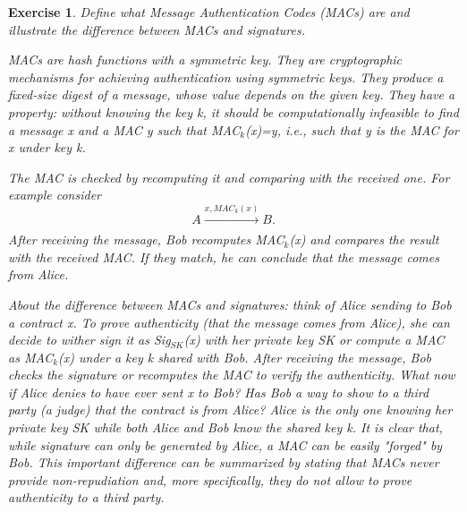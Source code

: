 \documentclass[a4paper, 12pt]{report}
\newtheorem{exercise}{\textbf{Exercise}}
\begin{document}
\begin{exercise}
	Define what Message Authentication Codes (MACs) are and illustrate the difference between MACs and signatures.
	
	MACs are hash functions with a symmetric key. They are cryptographic mechanisms for achieving authentication using symmetric keys. They produce a fixed-size digest of a message, whose value depends on the given key. They have a property: without knowing the key k, it should be computationally infeasible to find a message x and a MAC y such that MAC$_k$(x)=y, i.e., such that y is the MAC for x under key k.
	
	The MAC is checked by recomputing it and comparing with the received one. For example consider
	\[A\xrightarrow[]{x,MAC_k(x)}B.\]
	After receiving the message, Bob recomputes MAC$_k$(x) and compares the result with the received MAC. If they match, he can conclude that the message comes from Alice. 
	
	About the difference between MACs and signatures: think of Alice sending to Bob a contract x. To prove authenticity (that the message comes from Alice), she can decide to wither sign it as Sig$_{SK}$(x) with her private key SK or compute a MAC as MAC$_k$(x) under a key k shared with Bob. After receiving the message, Bob checks the signature or recomputes the MAC to verify the authenticity. What now if Alice denies to have ever sent x to Bob? Has Bob a way to show to a third party (a judge) that the contract is from Alice? Alice is the only one knowing her private key SK while both Alice and Bob know the shared key k. It is clear that, while signature can only be generated by Alice, a MAC can be easily "forged" by Bob. This important difference can be summarized by stating that MACs never provide non-repudiation and, more specifically, they do not allow to prove authenticity to a third party.  
\end{exercise}
\end{document}
